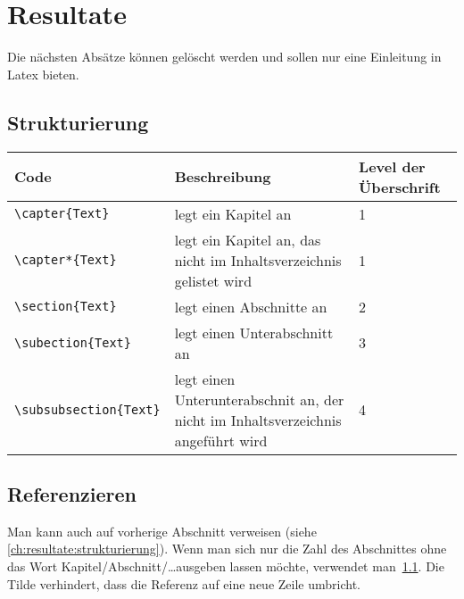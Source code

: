 \chapter{Resultate}
\label{ch:resultate}

Die nächsten Absätze können gelöscht werden und sollen nur eine Einleitung in Latex bieten.

\section{Strukturierung}
\label{ch:resultate:strukturierung}

\begin{tabular}{ l p{5.256cm} l }
    Code                   & Beschreibung                                                                     & Level der Überschrift \\ \hline
    \verb|\capter{Text}| & legt ein Kapitel an                                                              & 1                     \\
    \verb|\capter*{Text}| & legt ein Kapitel an, das nicht im Inhaltsverzeichnis gelistet wird               & 1                     \\
    \verb|\section{Text}| & legt einen Abschnitte an                                                         & 2                     \\
    \verb|\subection{Text}| & legt einen Unterabschnitt an                                                     & 3                     \\
    \verb|\subsubsection{Text}| & legt einen Unterunterabschnit an, der nicht im Inhaltsverzeichnis angeführt wird & 4
\end{tabular}

\section{Referenzieren}

Man kann auch auf vorherige Abschnitt verweisen (siehe \autoref{ch:resultate:strukturierung}). Wenn man sich nur die Zahl des Abschnittes ohne das Wort Kapitel/Abschnitt/\dots ausgeben lassen möchte, verwendet man~\ref{ch:resultate:strukturierung}. Die Tilde verhindert, dass die Referenz auf eine neue Zeile umbricht.

